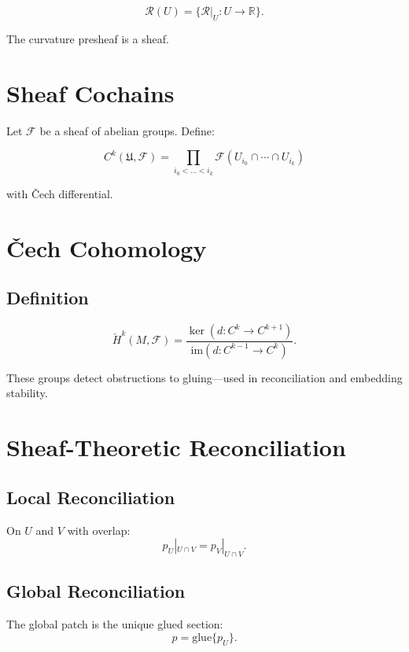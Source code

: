 \begin{definition}
\[
\mathcal{R}(U) = \{ \mathcal{R}|_U : U\to\mathbb{R} \}.
\]
\end{definition}

\begin{proposition}
The curvature presheaf is a sheaf.
\end{proposition}

\section{Sheaf Cochains}

Let $\mathcal{F}$ be a sheaf of abelian groups.  
Define:

\[
C^k(\mathfrak{U}, \mathcal{F})
  = \prod_{i_0 < \dots < i_k}
      \mathcal{F}(U_{i_0}\cap\cdots\cap U_{i_k})
\]

with Čech differential.

\section{Čech Cohomology}

\subsection{Definition}

\[
\check{H}^k(M,\mathcal{F})
  = \frac{\ker(d: C^k\to C^{k+1})}
         {\mathrm{im}(d: C^{k-1}\to C^k)}.
\]

These groups detect obstructions to gluing—used in reconciliation and embedding stability.

\section{Sheaf-Theoretic Reconciliation}

\subsection{Local Reconciliation}

On $U$ and $V$ with overlap:
\[
p_U|_{U\cap V} = p_V|_{U\cap V}.
\]

\subsection{Global Reconciliation}

The global patch is the unique glued section:
\[
p = \mathrm{glue}\{p_U\}.
\]

